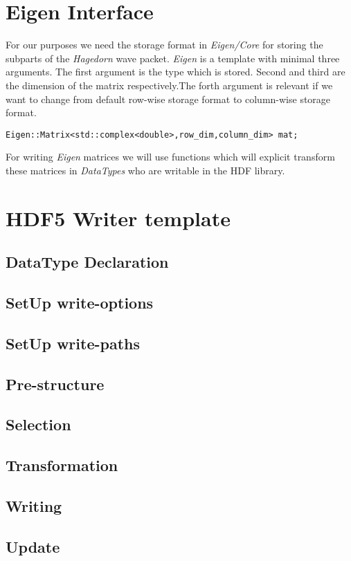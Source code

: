 \documentclass{article}
\begin{document}
\section{Eigen Interface}
For our purposes we need the storage format in \textit{Eigen/Core} for storing the subparts of the \textit{Hagedorn} wave packet. \textit{Eigen} is a template with minimal three arguments. The first argument is the type which is stored. Second and third are the dimension of the matrix respectively.The forth argument is relevant if we want to change from default row-wise storage format to column-wise storage format.
\begin{lstlisting}
Eigen::Matrix<std::complex<double>,row_dim,column_dim> mat;
\end{lstlisting}
For writing \textit{Eigen} matrices we will use functions which will explicit transform these matrices in \textit{DataTypes} who are writable in the HDF library.
\section{HDF5 Writer template}
\subsection{DataType Declaration}
\subsection{SetUp write-options}
\subsection{SetUp write-paths}
\subsection{Pre-structure}
\subsection{Selection}
\subsection{Transformation}
\subsection{Writing}
\subsection{Update}
\end{document}
